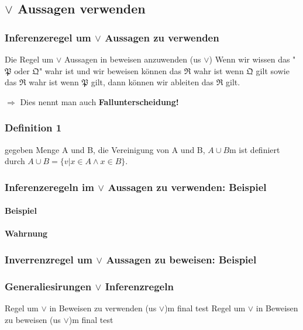     \subsection{\(\vee \) Aussagen verwenden}
        \subsubsection{Inferenzeregel um \(\vee\) Aussagen zu verwenden}
            {
                Die Regel um \(\vee\) Aussagen in beweisen anzuwenden (us \(\vee\))
            }
            {
                Wenn wir wissen das "\(\mathfrak{P} \text{ oder } \mathfrak{Q}\)" wahr ist und wir beweisen können das \(\mathfrak{R}\) wahr ist wenn \( \mathfrak{Q} \) gilt sowie das \(\mathfrak{R}\) wahr ist wenn \(\mathfrak{P}\) gilt, dann können wir ableiten das \(\mathfrak{R}\) gilt.
            }

            \(\Rightarrow\) Dies nennt man auch \textbf{Fallunterscheidung!}

        \subsubsection*{Definition 1}
            gegeben Menge A und B, die Vereinigung von A und B, \(A \cup B\)m ist definiert durch \(A \cup B = \{v \vert x \in A \wedge x \in B\}\).
        
        \subsubsection{Inferenzeregeln im \(\vee\) Aussagen zu verwenden: Beispiel}


        \paragraph{Beispiel}

        \paragraph*{Wahrnung}


        \subsubsection{Inverrenzregel um \(\vee\) Aussagen zu beweisen: Beispiel}

        \subsubsection{Generaliesirungen \(\vee\) Inferenzregeln}

        {
            Regel um \(\vee\) in Beweisen zu verwenden (us \(\vee\))m final
        }
        {
            test
        }
        {
            Regel um \(\vee\) in Beweisen zu beweisen (us \(\vee\))m final
        }
        {
            test
        }

    
